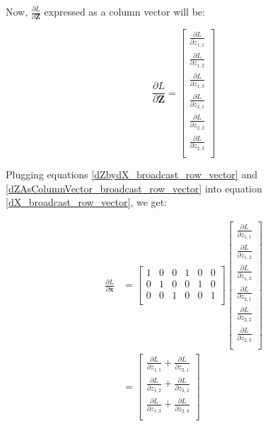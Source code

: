 \documentclass{article}
\newcommand{\vecr}[1]{\bm{#1}}
\newcommand{\matr}[1]{\mathbf{#1}} %
\begin{document}
Now, $\frac{\partial L}{\partial \matr{Z}}$ expressed as a column vector will be:

\begin{equation} \label{dZAsColumnVector_broadcast_row_vector}
\frac{\partial L}{\partial \matr{Z}} =
\begin{bmatrix}
\frac{\partial L}{\partial z_{1,1}} \\[0.7em]
\frac{\partial L}{\partial z_{1,2}} \\[0.7em]
\frac{\partial L}{\partial z_{1,3}} \\[0.7em]
\frac{\partial L}{\partial z_{2,1}} \\[0.7em]
\frac{\partial L}{\partial z_{2,2}} \\[0.7em]
\frac{\partial L}{\partial z_{2,3}} \\[0.7em]
\end{bmatrix}
\end{equation}

Plugging equations \ref{dZbydX_broadcast_row_vector} and \ref{dZAsColumnVector_broadcast_row_vector} into equation \ref{dX_broadcast_row_vector}, we get:

\begin{align}
\frac{\partial L}{\partial \vecr{x}} &=
\begin{bmatrix}
1 & 0 & 0 & 1 & 0 & 0\\%
0 & 1 & 0 & 0 & 1 & 0\\%
0 & 0 & 1 & 0 & 0 & 1\\%
\end{bmatrix}
\begin{bmatrix}
\frac{\partial L}{\partial z_{1,1}} \\[0.7em]
\frac{\partial L}{\partial z_{1,2}} \\[0.7em]
\frac{\partial L}{\partial z_{1,3}} \\[0.7em]
\frac{\partial L}{\partial z_{2,1}} \\[0.7em]
\frac{\partial L}{\partial z_{2,2}} \\[0.7em]
\frac{\partial L}{\partial z_{2,3}} \\[0.7em]
\end{bmatrix}
\nonumber \\
&=
\begin{bmatrix}
\frac{\partial L}{\partial z_{1,1}} +
\frac{\partial L}{\partial z_{2,1}} \\[0.7em]
\frac{\partial L}{\partial z_{1,2}} +
\frac{\partial L}{\partial z_{2,2}} \\[0.7em]
\frac{\partial L}{\partial z_{1,3}} +
\frac{\partial L}{\partial z_{2,3}} \\[0.7em]
\end{bmatrix} \label{dXAsColumnVector_broadcast_row_vector}
\end{align}
\end{document}
